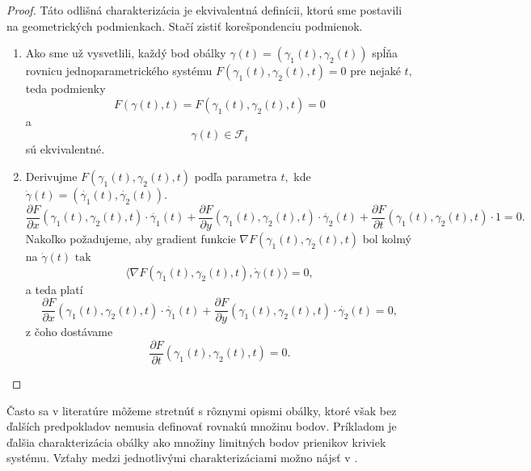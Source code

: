 \begin{proof}
Táto odlišná charakterizácia je ekvivalentná definícii, ktorú sme postavili na geometrických podmienkach. Stačí zistiť korešpondenciu podmienok.
\begin{enumerate}
\item Ako sme už vysvetlili, každý bod obálky ${\gamma}(t) = (\gamma_{1}(t),\gamma_{2}(t))$ spĺňa rovnicu jednoparametrického systému $F(\gamma_{1}(t),\gamma_{2}(t),t)=0$ pre nejaké $t,$ teda podmienky 
$$ F(\gamma(t), t) = F(\gamma_{1}(t), \gamma_{2}(t), t) = 0$$
a
$$\gamma(t) \in \mathcal{F}_{t}$$
sú ekvivalentné.
\item Derivujme $F(\gamma_{1}(t),\gamma_{2}(t), t)$ podľa parametra $t,$ kde $ \dot{\gamma}(t) = ( \dot{\gamma_{1}}(t), \dot{\gamma_{2}}(t) ).$
$$ \frac{\partial F}{\partial x}(\gamma_{1}(t),\gamma_{2}(t),t) \cdot \dot{\gamma_{1}}(t)+\frac{\partial F}{\partial y}(\gamma_{1}(t),\gamma_{2}(t),t) \cdot \dot{\gamma_{2}}(t)+\frac{\partial F}{\partial t}(\gamma_{1}(t),\gamma_{2}(t),t) \cdot 1 = 0. $$
Nakoľko požadujeme, aby gradient funkcie $\nabla F(\gamma_{1}(t),\gamma_{2}(t),t)$ bol kolmý na $\dot{\gamma}(t) \text{ tak}$
$$ \langle \nabla F(\gamma_{1}(t),\gamma_{2}(t),t), \dot{\gamma}(t) \rangle = 0,$$
a teda platí
$$ \frac{\partial F}{\partial x}(\gamma_{1}(t),\gamma_{2}(t),t) \cdot \dot{\gamma_{1}}(t)+\frac{\partial F}{\partial y}(\gamma_{1}(t),\gamma_{2}(t),t) \cdot \dot{\gamma_{2}}(t) = 0, $$
z čoho dostávame
$$ \frac{\partial F}{\partial t}(\gamma_{1}(t),\gamma_{2}(t),t) = 0. $$ 
\end{enumerate}
\end{proof}


Často sa v literatúre môžeme stretnúť s rôznymi opismi obálky, ktoré však bez ďalších predpokladov nemusia definovať rovnakú množinu bodov. Príkladom je ďalšia charakterizácia obálky ako množiny limitných bodov prienikov kriviek systému. Vzťahy medzi jednotlivými charakterizáciami možno nájsť v \cite{Bru81}.  

